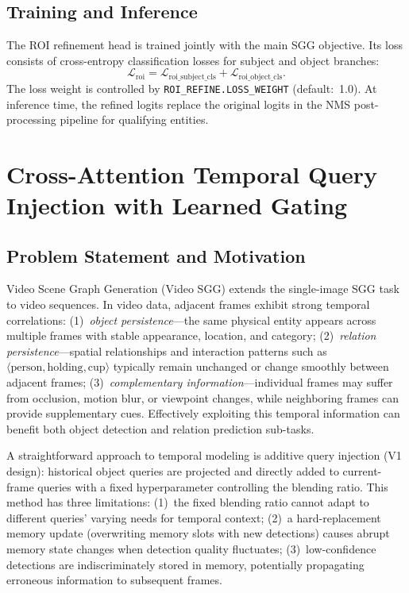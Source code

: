 \subsection{Training and Inference}

The ROI refinement head is trained jointly with the main SGG objective. Its loss consists of cross-entropy classification losses for subject and object branches:
\begin{equation}
\mathcal{L}_{\mathrm{roi}} = \mathcal{L}_{\mathrm{roi\_subject\_cls}} + \mathcal{L}_{\mathrm{roi\_object\_cls}}.
\end{equation}
The loss weight is controlled by \texttt{ROI\_REFINE.LOSS\_WEIGHT} (default:~1.0). At inference time, the refined logits replace the original logits in the NMS post-processing pipeline for qualifying entities.


\section{Cross-Attention Temporal Query Injection with Learned Gating}

\subsection{Problem Statement and Motivation}

Video Scene Graph Generation (Video SGG) extends the single-image SGG task to video sequences. In video data, adjacent frames exhibit strong temporal correlations: (1)~\textit{object persistence}—the same physical entity appears across multiple frames with stable appearance, location, and category; (2)~\textit{relation persistence}—spatial relationships and interaction patterns such as $\langle\text{person}, \text{holding}, \text{cup}\rangle$ typically remain unchanged or change smoothly between adjacent frames; (3)~\textit{complementary information}—individual frames may suffer from occlusion, motion blur, or viewpoint changes, while neighboring frames can provide supplementary cues. Effectively exploiting this temporal information can benefit both object detection and relation prediction sub-tasks.

A straightforward approach to temporal modeling is additive query injection (V1 design): historical object queries are projected and directly added to current-frame queries with a fixed hyperparameter controlling the blending ratio. This method has three limitations: (1)~the fixed blending ratio cannot adapt to different queries' varying needs for temporal context; (2)~a hard-replacement memory update (overwriting memory slots with new detections) causes abrupt memory state changes when detection quality fluctuates; (3)~low-confidence detections are indiscriminately stored in memory, potentially propagating erroneous information to subsequent frames.

